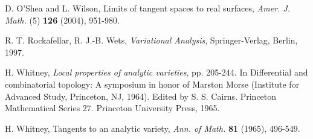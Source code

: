\documentclass[10pt,reqno]{amsart}
\theoremstyle{break-italic}
\theoremstyle{break-italic}
\theoremstyle{break-italic}
\theoremstyle{break-italic}
\theoremstyle{break-italic}
\theoremstyle{break-italic}
\theoremstyle{break-italic}
\theoremstyle{break-italic}
\theoremstyle{break-roman}
\theoremstyle{standard}
\theoremstyle{varthm-roman}
\theoremstyle{varthm-italic}
\theoremstyle{varthm-roman-break}
\theoremstyle{varthm-italic-break}
\theoremstyle{varthm-roman-no-punctuation}
\theoremstyle{varthm-italic-no-punctuation}
\numberwithin{equation}{section}
\begin{document}
\begin{thebibliography}{}
 D. O'Shea and  L. Wilson, Limits of tangent spaces to real surfaces,  \textit{Amer. J. Math.} (5) \textbf{126} (2004), 951-980.

 R. T. Rockafellar, R. J.-B. Wets, \textit{Variational Analysis}, Springer-Verlag, Berlin, 1997.


 H. Whitney, \textit{Local properties of analytic varieties}, pp. 205-244. In Differential and combinatorial topology: A symposium in honor of Marston Morse (Institute for Advanced Study, Princeton, NJ, 1964). Edited by S. S. Cairns. Princeton Mathematical Series 27. Princeton University Press, 1965.

 H. Whitney, Tangents to an analytic variety, \textit{Ann. of Math.} \textbf{81} (1965), 496-549.
\end{thebibliography}
\end{document}
